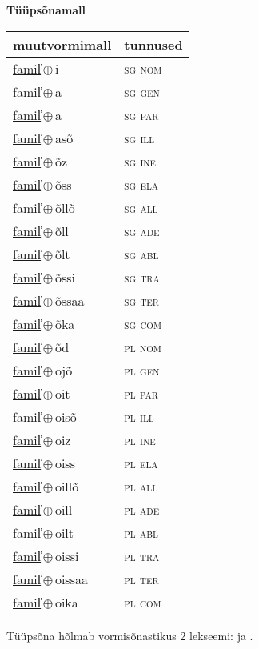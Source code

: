 

\vspace{3.5em}
\noindent \begin{minipage}{\textwidth}
\noindent \textbf{Tüüpsõnamall \,}\\

\begin{sideways}
\begin{tabular}{l l}
muutvormimall & tunnused \\
\hline
\underline{famil̕}\,$\oplus$\,i & \textsc{ sg nom } \\
\underline{famil̕}\,$\oplus$\,a & \textsc{ sg gen } \\
\underline{famil̕}\,$\oplus$\,a & \textsc{ sg par } \\
\underline{famil̕}\,$\oplus$\,asõ & \textsc{ sg ill } \\
\underline{famil̕}\,$\oplus$\,õz & \textsc{ sg ine } \\
\underline{famil̕}\,$\oplus$\,õss & \textsc{ sg ela } \\
\underline{famil̕}\,$\oplus$\,õllõ & \textsc{ sg all } \\
\underline{famil̕}\,$\oplus$\,õll & \textsc{ sg ade } \\
\underline{famil̕}\,$\oplus$\,õlt & \textsc{ sg abl } \\
\underline{famil̕}\,$\oplus$\,õssi & \textsc{ sg tra } \\
\underline{famil̕}\,$\oplus$\,õssaa & \textsc{ sg ter } \\
\underline{famil̕}\,$\oplus$\,õka & \textsc{ sg com } \\
\underline{famil̕}\,$\oplus$\,õd & \textsc{ pl nom } \\
\underline{famil̕}\,$\oplus$\,ojõ & \textsc{ pl gen } \\
\underline{famil̕}\,$\oplus$\,oit & \textsc{ pl par } \\
\underline{famil̕}\,$\oplus$\,oisõ & \textsc{ pl ill } \\
\underline{famil̕}\,$\oplus$\,oiz & \textsc{ pl ine } \\
\underline{famil̕}\,$\oplus$\,oiss & \textsc{ pl ela } \\
\underline{famil̕}\,$\oplus$\,oillõ & \textsc{ pl all } \\
\underline{famil̕}\,$\oplus$\,oill & \textsc{ pl ade } \\
\underline{famil̕}\,$\oplus$\,oilt & \textsc{ pl abl } \\
\underline{famil̕}\,$\oplus$\,oissi & \textsc{ pl tra } \\
\underline{famil̕}\,$\oplus$\,oissaa & \textsc{ pl ter } \\
\underline{famil̕}\,$\oplus$\,oika & \textsc{ pl com } \\
\end{tabular}
\end{sideways}
\label{tab:tüüpsõnamall-famil̕i}

\end{minipage}

 
\vspace{1em}
\noindent Tüüpsõna hõlmab vormisõnastikus 2 lekseemi:  ja .
